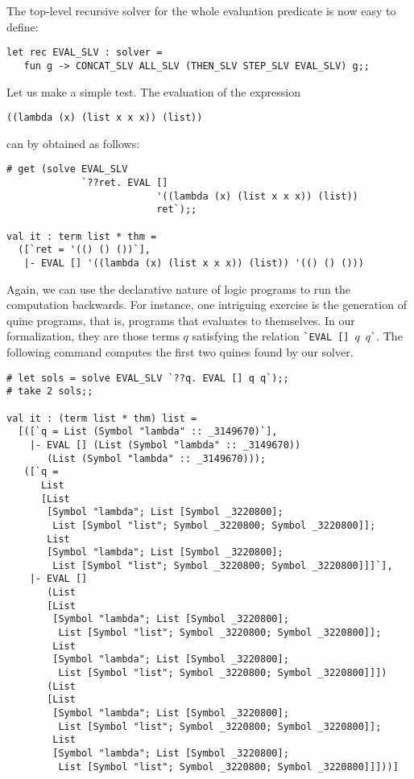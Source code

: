 The top-level recursive solver for the whole evaluation predicate is now easy to define:
\begin{verbatim}
let rec EVAL_SLV : solver =
   fun g -> CONCAT_SLV ALL_SLV (THEN_SLV STEP_SLV EVAL_SLV) g;;
\end{verbatim}

Let us make a simple test.  The evaluation of the expression
\begin{verbatim}
((lambda (x) (list x x x)) (list))
\end{verbatim}
can by obtained as follows:
\begin{verbatim}
# get (solve EVAL_SLV
             `??ret. EVAL []
                          '((lambda (x) (list x x x)) (list))
                          ret`);;

val it : term list * thm =
  ([`ret = '(() () ())`],
   |- EVAL [] '((lambda (x) (list x x x)) (list)) '(() () ()))
\end{verbatim}

Again, we can use the declarative nature of logic programs to run the
computation backwards.  For instance, one intriguing exercise is the
generation of quine programs, that is, programs that evaluates to
themselves.  In our formalization, they are those terms $q$ satisfying
the relation \verb|`EVAL|~\verb|[]|~$q$~$q$\verb|`|.  The following command
computes the first two quines found by our solver.
\begin{verbatim}
# let sols = solve EVAL_SLV `??q. EVAL [] q q`);;
# take 2 sols;;

val it : (term list * thm) list =
  [([`q = List (Symbol "lambda" :: _3149670)`],
    |- EVAL [] (List (Symbol "lambda" :: _3149670))
       (List (Symbol "lambda" :: _3149670)));
   ([`q =
      List
      [List
       [Symbol "lambda"; List [Symbol _3220800];
        List [Symbol "list"; Symbol _3220800; Symbol _3220800]];
       List
       [Symbol "lambda"; List [Symbol _3220800];
        List [Symbol "list"; Symbol _3220800; Symbol _3220800]]]`],
    |- EVAL []
       (List
       [List
        [Symbol "lambda"; List [Symbol _3220800];
         List [Symbol "list"; Symbol _3220800; Symbol _3220800]];
        List
        [Symbol "lambda"; List [Symbol _3220800];
         List [Symbol "list"; Symbol _3220800; Symbol _3220800]]])
       (List
       [List
        [Symbol "lambda"; List [Symbol _3220800];
         List [Symbol "list"; Symbol _3220800; Symbol _3220800]];
        List
        [Symbol "lambda"; List [Symbol _3220800];
         List [Symbol "list"; Symbol _3220800; Symbol _3220800]]]))]
\end{verbatim}

